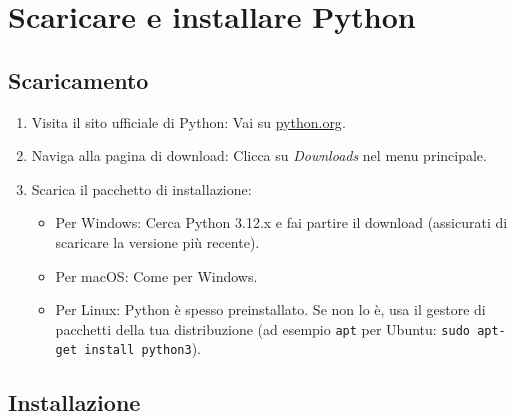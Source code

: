 \documentclass[
  letterpaper,
]{scrbook}
\providecommand{\tightlist}{%
  \setlength{\itemsep}{0pt}\setlength{\parskip}{0pt}}\usepackage{longtable,booktabs,array}
\begin{document}
\chapter{Scaricare e installare
Python}\label{scaricare-e-installare-python}

\section{Scaricamento}\label{scaricamento}

\begin{enumerate}
\def\labelenumi{\arabic{enumi}.}
\tightlist
\item
  Visita il sito ufficiale di Python: Vai su
  \href{https://www.python.org/}{python.org}.
\item
  Naviga alla pagina di download: Clicca su \emph{Downloads} nel menu
  principale.
\item
  Scarica il pacchetto di installazione:

  \begin{itemize}
  \tightlist
  \item
    Per Windows: Cerca Python 3.12.x e fai partire il download
    (assicurati di scaricare la versione più recente).
  \item
    Per macOS: Come per Windows.
  \item
    Per Linux: Python è spesso preinstallato. Se non lo è, usa il
    gestore di pacchetti della tua distribuzione (ad esempio
    \texttt{apt} per Ubuntu: \texttt{sudo\ apt-get\ install\ python3}).
  \end{itemize}
\end{enumerate}

\section{Installazione}\label{installazione}
\end{document}

